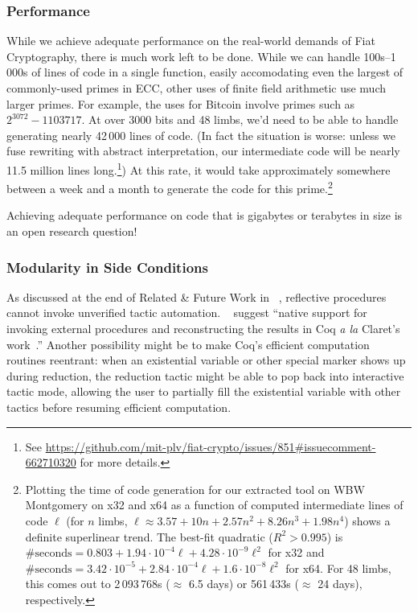 \documentclass[sn-mathphys,pdflatex]{sn-jnl}%
\makeatletter
\let\@badhref=\href
\renewcommand{\href}[2]{\@badhref{#2}{#1}}
\newcommand{\citetfield}[1]{\usebibentry{#1}{citet}~\cite{#1}}
\newcommand{\citechapter}[1]{\emph{\usebibentry{#1}{chapter}}~\cite{#1}}
\theoremstyle{thmstyleone}%
\theoremstyle{thmstyletwo}%
\theoremstyle{thmstylethree}%
\makeatother
\begin{document}
\subsubsection{Performance}\label{sec:future:perf}
While we achieve adequate performance on the real-world demands of Fiat Cryptography, there is much work left to be done.
While we can handle 100s--1\,000s of lines of code in a single function, easily accomodating even the largest of commonly-used primes in ECC, other uses of finite field arithmetic use much larger primes.
For example, the uses for Bitcoin involve primes such as $2^{3072} - 1103717$.
At over 3000 bits and 48 limbs, we'd need to be able to handle generating nearly 42\,000 lines of code.
(In fact the situation is worse: unless we fuse rewriting with abstract interpretation, our intermediate code will be nearly 11.5 million lines long.\footnote{%
See \href{https://github.com/mit-plv/fiat-crypto/issues/851\#issuecomment-662710320}{Fiat Crypto Issue \#851: Support for large finite fields} for more details.%
})
At this rate, it would take approximately somewhere between a week and a month to generate the code for this prime.\footnote{%
Plotting the time of code generation for our extracted tool on WBW Montgomery on x32 and x64 as a function of computed intermediate lines of code $\ell$ (for $n$ limbs, $\ell \approx 3.57+10n+2.57n^2+8.26n^3+1.98n^4$) shows a definite superlinear trend.
The best-fit quadratic ($R^2 > 0.995$) is $\text{\# seconds} = 0.803 + 1.94\cdot 10^{-4}\ell + 4.28\cdot 10^{-9}\ell^2$ for x32 and $\text{\# seconds} = 3.42\cdot 10^{-5} + 2.84\cdot 10^{-4}\ell + 1.6\cdot 10^{-8}\ell^2$ for x64.
For 48 limbs, this comes out to 2\,093\,768s ($\approx$ 6.5 days) or 561\,433s ($\approx$ 24 days), respectively.%
}

Achieving adequate performance on code that is gigabytes or terabytes in size is an open research question!

\subsubsection{Modularity in Side Conditions}\label{sec:future:modular}
As discussed at the end of Related \& Future Work in \citechapter{rtac}, reflective procedures cannot invoke unverified tactic automation.
\citetfield{rtac} suggest ``native support for invoking external procedures and reconstructing the results in Coq \emph{a la} Claret's work~\cite{claret2013lightweight}.''
Another possibility might be to make Coq's efficient computation routines reentrant:
when an existential variable or other special marker shows up during reduction, the reduction tactic might be able to pop back into interactive tactic mode, allowing the user to partially fill the existential variable with other tactics before resuming efficient computation.
\end{document}
